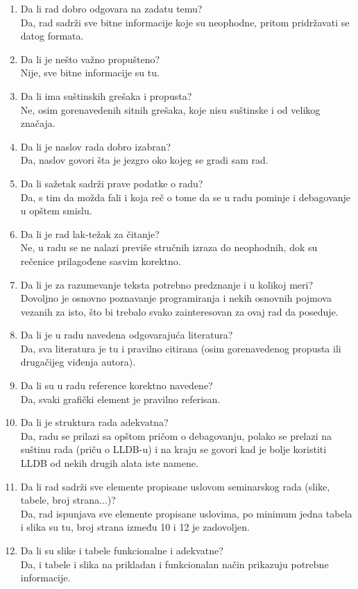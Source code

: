 \documentclass[a4paper]{report}
\begin{document}
\begin{enumerate}
\item Da li rad dobro odgovara na zadatu temu?\\
Da, rad sadrži sve bitne informacije koje su neophodne, pritom pridržavati se datog formata.
\item Da li je nešto važno propušteno?\\
Nije, sve bitne informacije su tu.
\item Da li ima suštinskih grešaka i propusta?\\
Ne, osim gorenavedenih sitnih grešaka, koje nisu suštinske i od velikog značaja.
\item Da li je naslov rada dobro izabran?\\
Da, naslov govori šta je jezgro oko kojeg se gradi sam rad.
\item Da li sažetak sadrži prave podatke o radu?\\
Da, s tim da možda fali i koja reč o tome da se u radu pominje i debagovanje u opštem smislu.
\item Da li je rad lak-težak za čitanje?\\
Ne, u radu se ne nalazi previše stručnih izraza do neophodnih, dok su rečenice prilagođene sasvim korektno.
\item Da li je za razumevanje teksta potrebno predznanje i u kolikoj meri?\\
Dovoljno je osnovno poznavanje programiranja i nekih osnovnih pojmova vezanih za isto,
što bi trebalo svako zainteresovan za ovaj rad da poseduje.
\item Da li je u radu navedena odgovarajuća literatura?\\
Da, sva literatura je tu i pravilno citirana (osim gorenavedenog propusta ili drugačijeg viđenja autora).
\item Da li su u radu reference korektno navedene?\\
Da, svaki grafički element je pravilno referisan.
\item Da li je struktura rada adekvatna?\\
Da, radu se prilazi sa opštom pričom o debagovanju, polako se prelazi na suštinu rada (priču o LLDB-u) 
i na kraju se govori kad je bolje koristiti LLDB od nekih drugih alata iste namene.
\item Da li rad sadrži sve elemente propisane uslovom seminarskog rada (slike, tabele, broj strana...)?\\
Da, rad ispunjava sve elemente propisane uslovima, po minimum jedna tabela i slika su tu, broj strana 
između 10 i 12 je zadovoljen.
\item Da li su slike i tabele funkcionalne i adekvatne?\\
Da, i tabele i slika na prikladan i funkcionalan način prikazuju potrebne informacije.
\end{enumerate}
\end{document}
